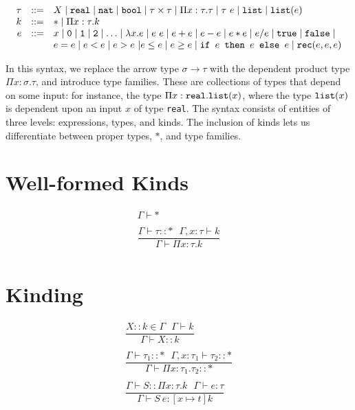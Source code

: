  \[
\begin{array}{rcl}
\tau &::=& X \mid \texttt{real} \mid \texttt{nat} \mid \texttt{bool} \mid \tau \times \tau \mid \Pi x:\tau.\tau
\mid \tau \ e \mid \texttt{list} \mid \texttt{list}(e) \\
k &::=& * \mid \Pi x : \tau.k \\
e &::=& x  \mid \texttt{0} \mid \texttt{1} \mid \texttt{2} \mid \dotsc \mid \lambda x.e \mid e \ e \mid e + e \mid e - e \mid  e  *  e \mid e / e \mid \texttt{true} \mid \texttt{false} \mid \\
  && e  =  e \mid e < e \mid e > e \ | e \leq e \mid e \geq e \mid 
     \texttt{if } e \texttt{ then } e \texttt{ else } e \mid \texttt{rec}(e, e, e) 
\end{array}
\]

In this syntax, we replace the arrow type $\sigma \rightarrow \tau$ with the dependent product type
$\Pi x:\sigma.\tau$, and introduce type families. These are collections of types that depend on some input: for instance,
the type $\Pi x:\texttt{real}.\texttt{list}(x)$, where the type $\texttt{list}(x)$ is dependent upon an input $x$ of type \texttt{real}.
The syntax consists of entities of three levels: expressions, types, and kinds. The inclusion of kinds lets us
differentiate between proper types, $*$, and type families.

\section{Well-formed Kinds}
\[
\begin{array}{c}
\Gamma \vdash * \\ \\
\dfrac{\Gamma \vdash \tau :: * \ \ \ \Gamma,x:\tau \vdash k}{\Gamma \vdash \Pi x:\tau.k} \\
\end{array}
\]

\section{Kinding}
\begin{figure}[H]
\[
\begin{array}{c}
\dfrac{X :: k \in \Gamma \ \ \ \Gamma \vdash k}{\Gamma \vdash X :: k} \\ \\
\dfrac{\Gamma \vdash \tau_1 :: * \ \ \ \Gamma, x:\tau_1 \vdash \tau_2 :: *}{\Gamma \vdash \Pi x:\tau_1.\tau_2 :: *} \\ \\
\dfrac{\Gamma \vdash S :: \Pi x:\tau.k \ \ \ \Gamma \vdash e : \tau}{\Gamma \vdash S \ e : [x \mapsto t]k} \\ \\
\end{array}
\]
\end{figure}

